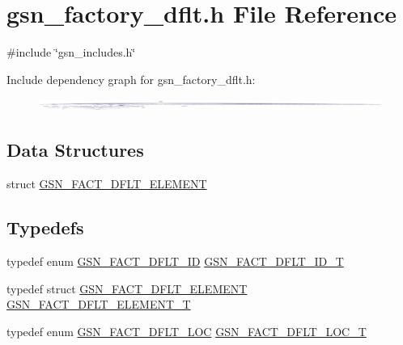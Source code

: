 \hypertarget{a00499}{
\section{gsn\_\-factory\_\-dflt.h File Reference}
\label{a00499}
}
{\ttfamily \#include \char`\"{}gsn\_\-includes.h\char`\"{}}\par
Include dependency graph for gsn\_\-factory\_\-dflt.h:
\nopagebreak
\begin{figure}[H]
\begin{center}
\leavevmode
\includegraphics[width=400pt]{a00728}
\end{center}
\end{figure}
\subsection*{Data Structures}
\begin{DoxyCompactItemize}
\item 
struct \hyperlink{a00073}{GSN\_\-FACT\_\-DFLT\_\-ELEMENT}
\end{DoxyCompactItemize}
\subsection*{Typedefs}
\begin{DoxyCompactItemize}
\item 
typedef enum \hyperlink{a00499_a36c3dc2e14b83eabfa65c84a1b36753f}{GSN\_\-FACT\_\-DFLT\_\-ID} \hyperlink{a00499_af0b40f06ec607fa54127f161de39a863}{GSN\_\-FACT\_\-DFLT\_\-ID\_\-T}
\item 
typedef struct \hyperlink{a00073}{GSN\_\-FACT\_\-DFLT\_\-ELEMENT} \hyperlink{a00499_a67e133fd5c43da29e9898c75bae3f4f0}{GSN\_\-FACT\_\-DFLT\_\-ELEMENT\_\-T}
\item 
typedef enum \hyperlink{a00499_a82305aaac9039404aaedce035f4d4445}{GSN\_\-FACT\_\-DFLT\_\-LOC} \hyperlink{a00499_a58731fb30753a481c13ac95fbcfbb029}{GSN\_\-FACT\_\-DFLT\_\-LOC\_\-T}
\end{DoxyCompactItemize}
